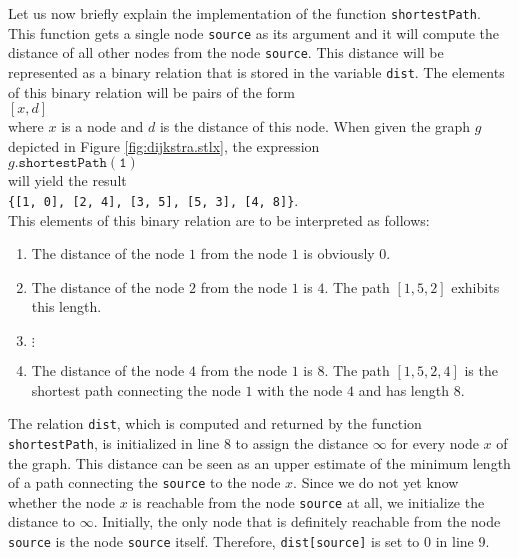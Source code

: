 Let us now briefly explain the implementation of the function \texttt{shortestPath}.  This function
gets a single node \texttt{source} as its argument and it will compute the distance of all other
nodes from the node \texttt{source}.  This distance will be represented as a binary relation that is stored
in the variable \texttt{dist}.  The elements of this binary relation will be pairs of the form
\\[0.2cm]
\hspace*{1.3cm}
$[x, d]$
\\[0.2cm]
where $x$ is a node and $d$ is the distance of this node.
When given the graph $g$ depicted in Figure \ref{fig:dijkstra.stlx}, the
expression 
\\[0.2cm]
\hspace*{1.3cm}
$g\mathtt{.shortestPath(1)}$
\\[0.2cm]
will yield the result
\\[0.2cm]
\hspace*{1.3cm}
\texttt{\{[1, 0], [2, 4], [3, 5], [5, 3], [4, 8]\}}.
\\[0.2cm]
This elements of this binary relation are to be interpreted as follows:  
\begin{enumerate}
\item The distance of the node $1$ from the node $1$ is obviously $0$.
\item The distance of the node $2$ from the node $1$ is $4$.  
      The path $[1,5,2]$ exhibits this length.
\item $\vdots$
\item The distance of the node $4$ from the node $1$ is $8$.
      The path $[1,5,2,4]$ is the shortest path connecting the node $1$ with the node $4$
      and has length $8$.
\end{enumerate}
The relation \texttt{dist}, which is computed and returned by the function \texttt{shortestPath}, is
initialized in line 8 to assign the distance $\infty$ for every node $x$ of the graph.  This distance
can be seen as an upper estimate of the minimum length of a path connecting the \texttt{source} to
the node $x$.  Since we do not yet know whether the node $x$ is reachable from the node
\texttt{source} at all, we initialize the distance to $\infty$.
Initially, the only node that is definitely reachable from the node \texttt{source} is the node
\texttt{source} itself.  Therefore, \texttt{dist[source]} is set to $0$ in line 9.

